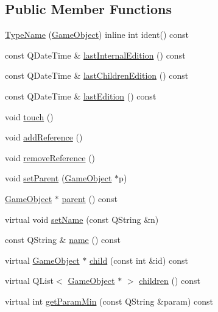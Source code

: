 \subsection*{\-Public \-Member \-Functions}
\begin{DoxyCompactItemize}
\item 
\hyperlink{class_game_object_a315198e0ee3ad32231cc2b785805b9d3}{\-Type\-Name} (\hyperlink{class_game_object}{\-Game\-Object}) inline int ident() const 
\item 
const \-Q\-Date\-Time \& \hyperlink{class_game_object_a0c4cc65819b30ec36a1c20a1c24997fe}{last\-Internal\-Edition} () const 
\item 
const \-Q\-Date\-Time \& \hyperlink{class_game_object_acc65ad08191fcaf558bd1840a45d23cf}{last\-Children\-Edition} () const 
\item 
const \-Q\-Date\-Time \& \hyperlink{class_game_object_a73b351287147712a937e87028bf8c876}{last\-Edition} () const 
\item 
void \hyperlink{class_game_object_a2130d5674df041b5a7eaf987f9b1e642}{touch} ()
\item 
void \hyperlink{class_game_object_a815c7f587c0ae528614add95655d9a0a}{add\-Reference} ()
\item 
void \hyperlink{class_game_object_a68725fd75f55bc73bb44216406ce34e5}{remove\-Reference} ()
\item 
void \hyperlink{class_game_object_ae34944b23d5d7d472d5c8da3f42fb2e3}{set\-Parent} (\hyperlink{class_game_object}{\-Game\-Object} $\ast$p)
\item 
\hyperlink{class_game_object}{\-Game\-Object} $\ast$ \hyperlink{class_game_object_af3deaf39cde23c189765634e32e95bb4}{parent} () const 
\item 
virtual void \hyperlink{class_game_object_ae928d2f18b5a26656ad41b7c27b463a7}{set\-Name} (const \-Q\-String \&n)
\item 
const \-Q\-String \& \hyperlink{class_game_object_aede5e0829a5fe107b1419bd62f03c132}{name} () const 
\item 
virtual \hyperlink{class_game_object}{\-Game\-Object} $\ast$ \hyperlink{class_game_object_a97fbf0507cf140b9f3abb568c6a97145}{child} (const int \&id) const 
\item 
virtual \-Q\-List$<$ \hyperlink{class_game_object}{\-Game\-Object} $\ast$ $>$ \hyperlink{class_game_object_a3f68b64d3a0793048cfe5deab35397e0}{children} () const 
\item 
virtual int \hyperlink{class_game_object_a3a308cc3f1d11d66dd5583fb531035c3}{get\-Param\-Min} (const \-Q\-String \&param) const 

\end{DoxyCompactItemize}
